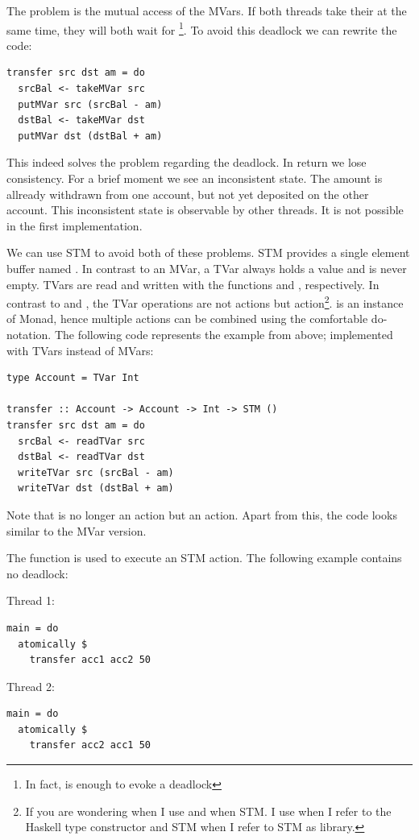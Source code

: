 The problem is the mutual access of the MVars. If both threads take their  at the same time, they will both wait for 
\footnote{In fact,  is enough to evoke a deadlock}. To avoid this deadlock we can rewrite the code:
\begin{lstlisting}
transfer src dst am = do
  srcBal <- takeMVar src
  putMVar src (srcBal - am)
  dstBal <- takeMVar dst
  putMVar dst (dstBal + am)
\end{lstlisting}
This indeed solves the problem regarding the deadlock. In return we lose consistency. For a brief moment we see an inconsistent state. 
The amount is allready withdrawn from one account, but not yet deposited on the other account. This inconsistent state is observable by other 
threads. It is not possible in the first implementation. 

We can use STM to avoid both of these problems. STM provides a single element buffer named . In contrast to an MVar, a 
TVar always holds a value and is never empty. TVars are read and written with the functions  and , respectively. 
In contrast to  and , the TVar operations are not  actions but  action\footnote{If 
you are wondering when I use  and when STM. I use  when I refer to the Haskell type constructor and STM when I refer to STM as library.}. 
 is an instance of Monad, hence multiple  actions can be combined
using the comfortable do-notation. The following code represents the example from above; implemented with TVars instead of MVars:
\begin{lstlisting}
type Account = TVar Int

transfer :: Account -> Account -> Int -> STM ()
transfer src dst am = do
  srcBal <- readTVar src
  dstBal <- readTVar dst
  writeTVar src (srcBal - am)
  writeTVar dst (dstBal + am)
\end{lstlisting}
Note that  is no longer an  action but an  action. Apart from this, the code looks
similar to the MVar version.

The function  is used to execute an STM action. 
The following example contains no deadlock:
\par\noindent
\begin{minipage}[t]{.45\textwidth}
Thread 1:
\begin{lstlisting}[frame=lrtb]
main = do
  atomically $
    transfer acc1 acc2 50
\end{lstlisting}
\end{minipage}
\hfill
\begin{minipage}[t]{.45\textwidth}
Thread 2:
\begin{lstlisting}[frame=lrtb]
main = do 
  atomically $ 
    transfer acc2 acc1 50
\end{lstlisting}
\end{minipage}

